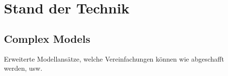 \chapter{Stand der Technik}
\label{cha:stateoftheart}

\section{Complex Models}
\label{sec:complex models}

Erweiterte Modellansätze, welche Vereinfachungen können wie abgeschafft werden, usw.
